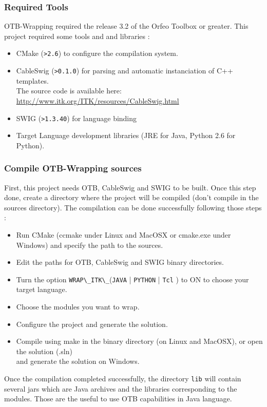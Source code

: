 \subsubsection{Required Tools}
OTB-Wrapping required the release 3.2 of the Orfeo Toolbox or greater. This project required some tools and 
and libraries : 
\begin{itemize}
\item CMake (\verb!>2.6!) to configure the compilation system.
\item CableSwig (\verb!>0.1.0!) for parsing and automatic instanciation of C++ templates.\\
      The source code is available here: \url{http://www.itk.org/ITK/resources/CableSwig.html}
\item SWIG  (\verb!>1.3.40!) for language binding
\item Target Language development libraries (JRE for Java, Python 2.6 for Python).
\end{itemize}

\subsubsection{Compile OTB-Wrapping sources}
First, this project needs OTB, CableSwig and SWIG to be built. Once this step done, create a 
directory where the project will be compiled (don't compile in the sources directory).
The compilation can be done successfully following those steps :

\begin{itemize}
\item Run CMake (ccmake under Linux and MacOSX or cmake.exe under Windows) and specify the path to the sources.
\item Edit the paths for OTB, CableSwig and SWIG binary directories.
\item Turn the option \verb|WRAP\_ITK\_|(\verb|JAVA| | \verb|PYTHON| | \verb|Tcl|  )  to ON to choose your target language.
\item Choose the modules you want to wrap.
\item Configure the project and generate the solution.
\item Compile using make in the binary directory (on Linux and MacOSX), or open the solution (.sln)\\
      and generate the solution on Windows.
\end{itemize}

Once the compilation completed successfully, the directory \verb|lib| will contain several jars which are Java archives 
and the libraries corresponding to the modules. Those are the useful to use OTB capabilities in Java language.

